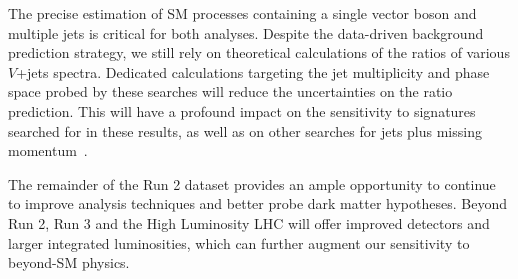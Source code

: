 The precise estimation of SM processes containing a single vector boson and multiple jets is critical for both analyses.
Despite the data-driven background prediction strategy, we still rely on theoretical calculations of the ratios of various $V$+jets spectra.
Dedicated calculations targeting the jet multiplicity and phase space probed by these searches will reduce the uncertainties on the ratio prediction.
This will have a profound impact on the sensitivity to signatures searched for in these results, as well as on other searches for jets plus missing momentum~\cite{monojet,monohiggs,ttdm}.

The remainder of the Run 2 dataset provides an ample opportunity to continue to improve analysis techniques and better probe dark matter hypotheses.
Beyond Run 2, Run 3 and the High Luminosity LHC will offer improved detectors and larger integrated luminosities, which can further augment our sensitivity to beyond-SM physics.
